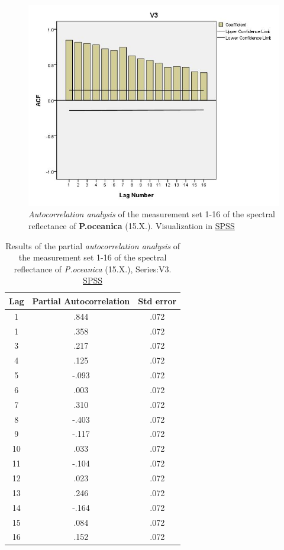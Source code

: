 \documentclass[10pt, a4paper]{article}
\begin{document}
\begin{appendices}
\begin{figure}[H]
	\centering
	\includegraphics[scale=0.45]{Autocorr.jpg}
	\caption{\textit{Autocorrelation analysis} of the measurement set 1-16 of the spectral reflectance of \textbf{P.oceanica} (15.X.). Visualization in \href{http://www.spss.com/}{SPSS}}
	\label{fig:52}
\end{figure}
\pagebreak
\newpage

\begin{table}[htbp]
	\caption{Results of the partial \textit{autocorrelation analysis} of the measurement set 1-16 of the spectral reflectance of \textit{P.oceanica} (15.X.), Series:V3. \href{http://www.spss.com/}{SPSS}}\label{tab:14}
	\begin{center}
	\begin{tabular}{|c|c|c|}
		\hline\hline
			Lag & Partial Autocorrelation & Std error\\ \hline\hline
			1 & .844 & .072 \\ \hline
			1 &.358 & .072 \\ \hline
			3 & .217 &.072 \\ \hline
			4 & .125 &.072 \\ \hline
			5 & -.093 & .072 \\ \hline
			6 & .003 & .072 \\ \hline
			7 & .310 & .072 \\ \hline
			8 & -.403 & .072 \\ \hline
			9 & -.117 & .072 \\ \hline
			10 & .033 & .072 \\ \hline
			11 & -.104 & .072 \\ \hline
			12 & .023 &.072 \\ \hline
			13 & .246 &.072 \\ \hline
			14 & -.164 & .072 \\ \hline
			15 & .084 & .072 \\ \hline
			16 & .152 & .072 \\ \hline
	\end{tabular}
	\end{center}
\end{table}


\end{appendices}
\end{document}
